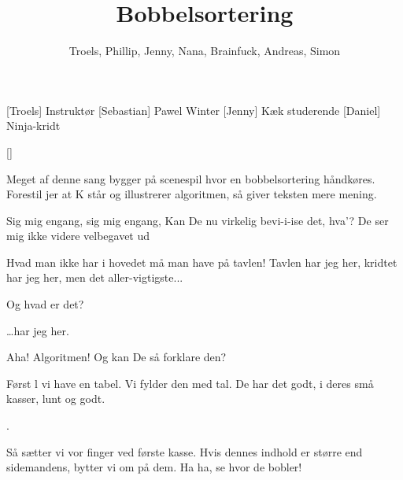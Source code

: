 \documentclass[a4paper,11pt]{article}
\title{Bobbelsortering}
\author{Troels, Phillip, Jenny, Nana, Brainfuck, Andreas, Simon}
\begin{document}
\maketitle

\begin{roles}
  [Troels] Instruktør
  [Sebastian] Pawel Winter
  [Jenny] Kæk studerende
  [Daniel] Ninja-kridt
\end{roles}

\begin{props}
  []
\end{props}

Meget af denne sang bygger på scenespil hvor en bobbelsortering
håndkøres.  Forestil jer at K står og illustrerer algoritmen, så giver
teksten mere mening.

\begin{sketch}
   Sig mig engang, sig mig engang, Kan De nu virkelig
  bevi-i-ise det, hva'?  De ser mig ikke videre velbegavet ud

   Hvad man ikke har i hovedet må man have på tavlen!  Tavlen
  har jeg her, kridtet har jeg her, men det aller-vigtigste...

   Og hvad er det?

   \ldots har jeg her.

   Aha! Algoritmen!  Og kan De så forklare den?

   Først l vi have en tabel.  Vi fylder den med tal.
  De har det godt, i deres små kasser, lunt og godt.

  .

   Så sætter vi vor finger ved første kasse.  Hvis dennes
  indhold er større end sidemandens, bytter vi om på dem.  Ha ha, se
  hvor de bobler!
\end{sketch}

\end{document}
